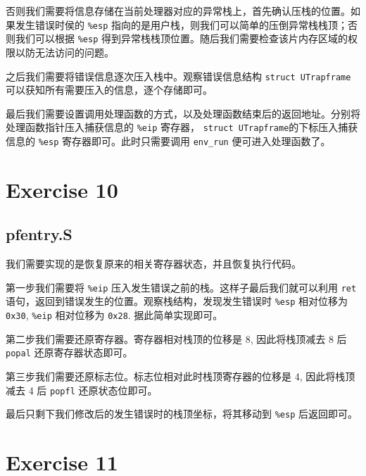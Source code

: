 \documentclass[11pt]{article}
\begin{document}
		\par 否则我们需要将信息存储在当前处理器对应的异常栈上，首先确认压栈的位置。如果发生错误时侯的 \texttt{\%esp} 指向的是用户栈，则我们可以简单的压倒异常栈栈顶；否则我们可以根据 \texttt{\%esp} 得到异常栈栈顶位置。随后我们需要检查该片内存区域的权限以防无法访问的问题。
		
		\par 之后我们需要将错误信息逐次压入栈中。观察错误信息结构 \texttt{struct UTrapframe} 可以获知所有需要压入的信息，逐个存储即可。
		
		\par 最后我们需要设置调用处理函数的方式，以及处理函数结束后的返回地址。分别将处理函数指针压入捕获信息的 \texttt{\%eip} 寄存器， \texttt{struct UTrapframe}的下标压入捕获信息的 \texttt{\%esp} 寄存器即可。此时只需要调用 \texttt{env\_run} 便可进入处理函数了。
		
	\section{Exercise 10}
	
	\subsection*{pfentry.S}
		
		\par 我们需要实现的是恢复原来的相关寄存器状态，并且恢复执行代码。
		
		\par 第一步我们需要将 \texttt{\%eip} 压入发生错误之前的栈。这样子最后我们就可以利用 \texttt{ret} 语句，返回到错误发生的位置。观察栈结构，发现发生错误时 \texttt{\%esp} 相对位移为 \texttt{0x30}, \texttt{\%eip} 相对位移为 \texttt{0x28}. 据此简单实现即可。
		
		\par 第二步我们需要还原寄存器。寄存器相对栈顶的位移是 8, 因此将栈顶减去 8 后 \texttt{popal} 还原寄存器状态即可。
		
		\par 第三步我们需要还原标志位。标志位相对此时栈顶寄存器的位移是 4, 因此将栈顶减去 4 后 \texttt{popfl} 还原状态位即可。
		
		\par 最后只剩下我们修改后的发生错误时的栈顶坐标，将其移动到 \texttt{\%esp} 后返回即可。
	
		
	\section{Exercise 11}
		
\end{document}
